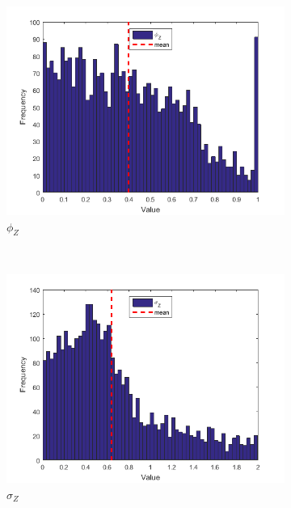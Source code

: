 \documentclass[11pt,a4,twosided,singlespacing,titlepagenumber=on]{scrreprt}
\numberwithin{equation}{chapter} %
\theoremstyle{remark}
\begin{document}
\begin{figure}[H]
\begin{subfigure}[t]{0.32\textwidth}
        \includegraphics[width=1\textwidth]{res/params/3653_4384/3}
        \caption{$\phi_Z$}
    \end{subfigure} \\
    \begin{subfigure}[t]{0.32\textwidth}
        \centering
        \includegraphics[width=1\textwidth]{res/params/3653_4384/4}
        \caption{$\sigma_Z$}
    \end{subfigure}
    \begin{subfigure}[t]{0.32\textwidth}
        \centering

\end{subfigure}
\end{figure}
\end{document}

